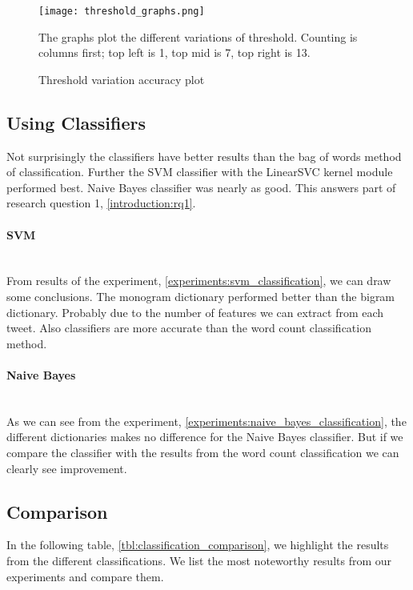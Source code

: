 \begin{figure}[htb]
    \centering
    \texttt{[image: threshold\_graphs.png]}
    \label{fig:threshold_graphs}
    \caption{Threshold variation accuracy plot}
The graphs plot the different variations of threshold. Counting is
columns first; top left is 1, top mid is 7, top right is 13.
\end{figure}

\subsection{Using Classifiers}
Not surprisingly the classifiers have better results than the bag of words
method of classification. Further the SVM classifier with the LinearSVC kernel
module performed best. Naive Bayes classifier was nearly as good. This answers
part of research question 1, \ref{introduction:rq1}.

\paragraph{SVM}\label{results:svm_classification}
\hspace{0pt}\\
From results of the experiment, \ref{experiments:svm_classification}, we can draw
some conclusions. The monogram dictionary performed
better than the bigram dictionary. Probably due to the number of features we
can extract from each tweet. Also classifiers are more accurate than the word
count classification method.

\paragraph{Naive Bayes}\label{results:naive_bayes_classification}
\hspace{0pt}\\
As we can see from the experiment,
\ref{experiments:naive_bayes_classification}, the different dictionaries makes
no difference for the Naive Bayes classifier. But if we compare the classifier
with the results from the word count classification we can clearly see
improvement. 

\subsection{Comparison}\label{results:comparison}
In the following table, \ref{tbl:classification_comparison}, we highlight the
results from the different classifications. We list the most noteworthy results
from our experiments and compare them.


